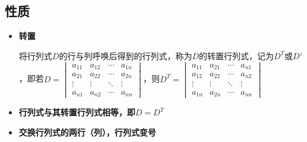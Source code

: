 \documentclass[UTF8]{ctexart}
\begin{document}
\subsection*{性质}
\begin{itemize}
  \item \textbf{转置}

  将行列式$D$的行与列呼唤后得到的行列式，称为$D$的转置行列式，记为$D^T$或$D'$，即若$\displaystyle D=
  \begin{vmatrix}
  a_{11}&a_{12}&\cdots&a_{1n}\\
  a_{21}&a_{22}&\cdots&a_{2n}\\
  \vdots&\vdots&\ddots&\vdots\\
  a_{n1}&a_{n2}&\cdots&a_{nn}
  \end{vmatrix}$，则$\displaystyle D^T=
  \begin{vmatrix}
  a_{11}&a_{21}&\cdots&a_{n1}\\
  a_{12}&a_{22}&\cdots&a_{n2}\\
  \vdots&\vdots&\ddots&\vdots\\
  a_{1n}&a_{2n}&\cdots&a_{nn}
  \end{vmatrix}$

  \item \textbf{行列式与其转置行列式相等，即$D=D^T$}
  \item \textbf{交换行列式的两行（列），行列式变号}


\end{itemize}
\end{document}
